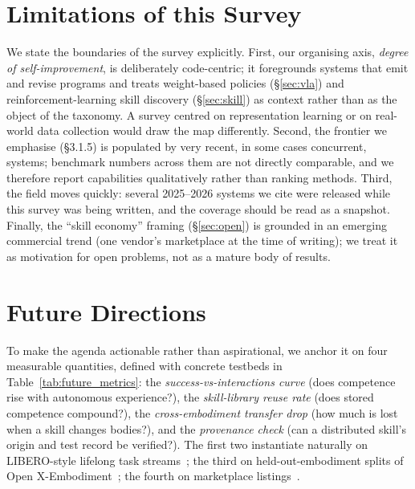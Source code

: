 \documentclass[acmsmall,screen,nonacm]{acmart}
\begin{document}
\section{Limitations of this Survey}
\label{sec:limitations}

We state the boundaries of the survey explicitly. First, our organising axis, \emph{degree
of self-improvement}, is deliberately code-centric; it foregrounds systems that emit and
revise programs and treats weight-based policies (\S\ref{sec:vla}) and reinforcement-learning
skill discovery (\S\ref{sec:skill}) as context rather than as the object of the taxonomy.
A survey centred on representation learning or on real-world data collection would draw the
map differently. Second, the frontier we emphasise (\S3.1.5) is populated by very recent,
in some cases concurrent, systems; benchmark numbers across them are not directly
comparable, and we therefore report capabilities qualitatively rather than ranking methods.
Third, the field moves quickly: several 2025--2026 systems we cite were released while this
survey was being written, and the coverage should be read as a snapshot. Finally, the
``skill economy'' framing (\S\ref{sec:open}) is grounded in an emerging commercial trend
(one vendor's marketplace at the time of writing); we treat it as motivation for open
problems, not as a mature body of results.
\section{Future Directions}
\label{sec:future}

To make the agenda actionable rather than aspirational, we anchor it on four measurable
quantities, defined with concrete testbeds in Table~\ref{tab:future_metrics}: the
\emph{success-vs-interactions curve} (does competence rise with autonomous experience?), the
\emph{skill-library reuse rate} (does stored competence compound?), the \emph{cross-embodiment
transfer drop} (how much is lost when a skill changes bodies?), and the \emph{provenance check}
(can a distributed skill's origin and test record be verified?). The first two instantiate
naturally on LIBERO-style lifelong task streams~\citep{libero}; the third on held-out-embodiment
splits of Open X-Embodiment~\citep{openx}; the fourth on marketplace
listings~\citep{unistore2026}.
\end{document}

